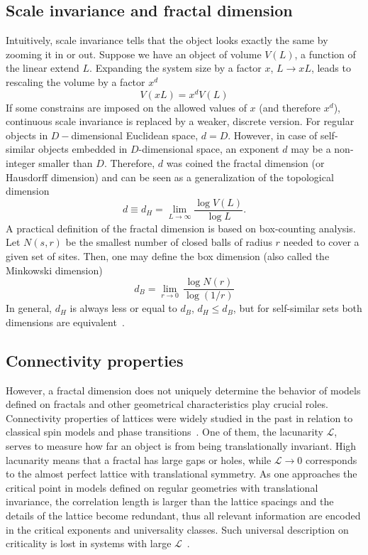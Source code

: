 \subsection{Scale invariance and fractal dimension}
Intuitively, scale invariance tells that the object looks exactly the same by zooming it in or out. Suppose we have an object of volume $V( L)$, a function of the linear extend $L$. Expanding the system size by a factor $x$, $L \rightarrow x L$, leads to rescaling the volume by a factor $x^d$
\begin{equation}
V( x L) = x^{d}  V(L) 
\label{eq:scale_inv}
\end{equation}
If some constrains are imposed on the allowed values of $x$ (and therefore $x^d$), continuous scale invariance is replaced by a weaker, discrete version. For regular objects in $D-$dimensional Euclidean space, $d = D$. However, in case of self-similar objects embedded in $D$-dimensional space, an exponent $d$ may be a non-integer smaller than $D$. Therefore, $d$ was coined the fractal dimension (or Hausdorff dimension) and can be seen as a generalization of the topological dimension
\begin{equation}
d  \equiv d_{H} = \lim_{L \rightarrow \infty} \frac{ \log V (L) }{ \log L}.
\label{eq:hausdorff}
\end{equation}
A practical definition of the fractal dimension is based on box-counting analysis. Let $N (s, r)$ be the smallest number of closed balls of radius $r$ needed to cover a given set of sites. Then, one may define the box dimension (also called the Minkowski dimension)
\begin{equation}
d_B = \lim_{r \rightarrow 0} \, \frac{\log N (r)}{\log ( 1 /r )}
\label{eq:box_dim}
\end{equation}
In general, $d_H$ is always less or equal to $d_B$, $d_H \leq d_B$, but for self-similar sets both dimensions are equivalent~\cite{falconer2004fractal}.

\subsection{Connectivity properties}
However, a fractal dimension does not uniquely determine the behavior of models defined on fractals and other geometrical characteristics play crucial roles. Connectivity properties of lattices were widely studied in the past in relation to classical spin models and phase transitions~\cite{Gefen_1983, doi:10.1080/13642818408238847, Penrose1986, fractalIsing1998}. One of them, the lacunarity $\mathcal{L}$, serves to measure how far an object is from being translationally invariant. High lacunarity means that a fractal has large gaps or holes, while $\mathcal{L} \rightarrow 0$ corresponds to the almost perfect lattice with translational symmetry. As one approaches the critical point in models defined on regular geometries with translational invariance, the correlation length is larger than the lattice spacings and the details of the lattice become redundant, thus all relevant information are encoded in the critical exponents and universality classes. Such universal description on criticality is lost in systems with large $\mathcal{L}$~\cite{Gefen_1984}.

